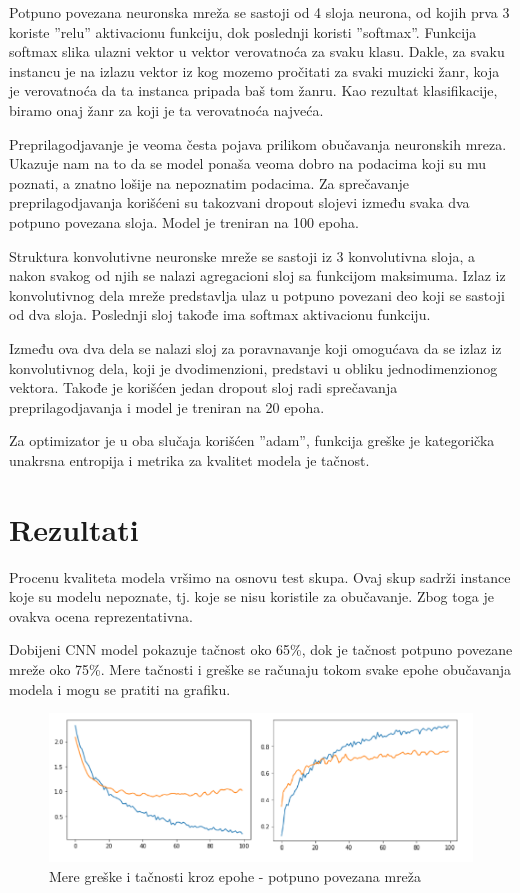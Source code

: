 \documentclass{article}
\begin{document}
Potpuno povezana neuronska mreža se sastoji od 4 sloja neurona, od kojih prva 3 koriste ''relu'' aktivacionu funkciju, dok poslednji koristi ''softmax''. Funkcija softmax slika ulazni vektor u vektor verovatnoća za svaku klasu. Dakle, za svaku instancu je na izlazu vektor iz kog mozemo pročitati za svaki muzicki žanr, koja je verovatnoća da ta instanca pripada baš tom žanru. Kao rezultat klasifikacije, biramo onaj žanr za koji je ta verovatnoća najveća.

Preprilagodjavanje je veoma česta pojava prilikom obučavanja neuronskih mreza. Ukazuje nam na to da se model ponaša veoma dobro na podacima koji su mu poznati, a znatno lošije na nepoznatim podacima. Za sprečavanje preprilagodjavanja korišćeni su takozvani dropout slojevi između svaka dva potpuno povezana sloja. Model je treniran na 100 epoha.

Struktura konvolutivne neuronske mreže se sastoji iz 3 konvolutivna sloja, a nakon svakog od njih se nalazi agregacioni sloj sa funkcijom maksimuma. Izlaz iz konvolutivnog dela mreže predstavlja ulaz u potpuno povezani deo koji se sastoji od dva sloja. Poslednji sloj takođe ima softmax aktivacionu funkciju.

Između ova dva dela se nalazi sloj za poravnavanje koji omogućava da se izlaz iz konvolutivnog dela, koji je dvodimenzioni, predstavi u obliku jednodimenzionog vektora. Takođe je korišćen jedan dropout sloj radi sprečavanja preprilagodjavanja i model je treniran na 20 epoha.

Za optimizator je u oba slučaja korišćen ''adam'', funkcija greške je kategorička unakrsna entropija i metrika za kvalitet modela je tačnost. 

\newpage

\section{Rezultati}

Procenu kvaliteta modela vršimo na osnovu test skupa. Ovaj skup sadrži instance koje su modelu nepoznate, tj. koje se nisu koristile za obučavanje. Zbog toga je ovakva ocena reprezentativna.

Dobijeni CNN model pokazuje tačnost oko 65\%, dok je tačnost potpuno povezane mreže oko 75\%. Mere tačnosti i greške se računaju tokom svake epohe obučavanja modela i mogu se pratiti na grafiku.

\begin{figure}[h]
\centering
\includegraphics[scale=0.7]{history}
\caption{Mere greške i tačnosti kroz epohe - potpuno povezana mreža}
\end{figure}
\end{document}
